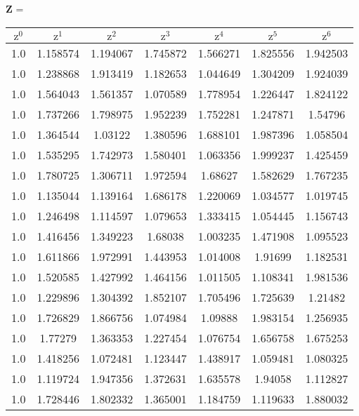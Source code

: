 \renewcommand{\arraystretch}{0.65}
\begin{center}
    \textrm{\textbf{Z}} = \begin{tabular}{ | c | c | c | c | c | c | c | } 
    \hline
    $\textrm{z}^0$ & $\textrm{z}^1$ & $\textrm{z}^2$ & $\textrm{z}^3$ & $\textrm{z}^4$ & $\textrm{z}^5$ & $\textrm{z}^6$ \\
    \hline
    1.0 & 1.158574 & 1.194067 & 1.745872 & 1.566271 & 1.825556 & 1.942503 \\ 
    \hline 
    1.0 & 1.238868 & 1.913419 & 1.182653 & 1.044649 & 1.304209 & 1.924039 \\ 
    \hline 
    1.0 & 1.564043 & 1.561357 & 1.070589 & 1.778954 & 1.226447 & 1.824122 \\ 
    \hline 
    1.0 & 1.737266 & 1.798975 & 1.952239 & 1.752281 & 1.247871 & 1.54796 \\
    \hline 
    1.0 & 1.364544 & 1.03122 & 1.380596 & 1.688101 & 1.987396 & 1.058504 \\ 
    \hline 
    1.0 & 1.535295 & 1.742973 & 1.580401 & 1.063356 & 1.999237 & 1.425459 \\ 
    \hline 
    1.0 & 1.780725 & 1.306711 & 1.972594 & 1.68627 & 1.582629 & 1.767235 \\ 
    \hline 
    1.0 & 1.135044 & 1.139164 & 1.686178 & 1.220069 & 1.034577 & 1.019745 \\  
    \hline 
    1.0 & 1.246498 & 1.114597 & 1.079653 & 1.333415 & 1.054445 & 1.156743 \\ 
    \hline 
    1.0 & 1.416456 & 1.349223 & 1.68038 & 1.003235 & 1.471908 & 1.095523 \\ 
    \hline 
    1.0 & 1.611866 & 1.972991 & 1.443953 & 1.014008 & 1.91699 & 1.182531 \\ 
    \hline 
    1.0 & 1.520585 & 1.427992 & 1.464156 & 1.011505 & 1.108341 & 1.981536 \\ 
    \hline 
    1.0 & 1.229896 & 1.304392 & 1.852107 & 1.705496 & 1.725639 & 1.21482 \\ 
    \hline 
    1.0 & 1.726829 & 1.866756 & 1.074984 & 1.09888 & 1.983154 & 1.256935 \\
    \hline 
    1.0 & 1.77279 & 1.363353 & 1.227454 & 1.076754 & 1.656758 & 1.675253 \\ 
    \hline 
    1.0 & 1.418256 & 1.072481 & 1.123447 & 1.438917 & 1.059481 & 1.080325 \\ 
    \hline 
    1.0 & 1.119724 & 1.947356 & 1.372631 & 1.635578 & 1.94058 & 1.112827 \\ 
    \hline 
    1.0 & 1.728446 & 1.802332 & 1.365001 & 1.184759 & 1.119633 & 1.880032 \\ 

\end{tabular}
\end{center}
